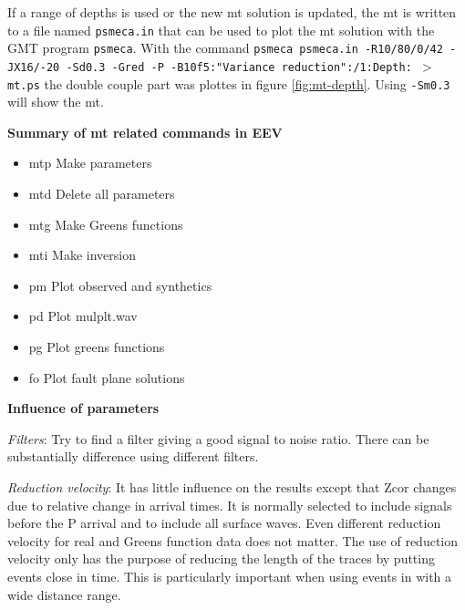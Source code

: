 If a range of depths is used or the new mt solution is updated, the mt is written to 
a file named \texttt{psmeca.in} that can be used to plot the mt solution with 
the GMT program \texttt{psmeca}. With the command\newline
\texttt{psmeca psmeca.in -R10/80/0/42 -JX16/-20 -Sd0.3 -Gred -P -B10f5:"Variance reduction":/1:Depth: $>$ mt.ps}\newline
the double couple part was plottes in figure \ref{fig:mt-depth}. 
Using \texttt{-Sm0.3} will show the mt.

\textbf{Summary of mt related commands in EEV}

\begin{itemize}
\item 
mtp	Make parameters
\item 
mtd	Delete all parameters
\item 
mtg	Make Greens functions
\item 
mti	Make inversion
\item 
pm	Plot observed and synthetics
\item 
pd	Plot mulplt.wav
\item 
pg	Plot greens functions
\item 
fo	Plot fault plane solutions
\end{itemize}

\textbf{Influence of parameters}

\textit{Filters}: Try to find a filter giving a good signal to noise ratio. There can be substantially difference using different filters. 

\textit{Reduction velocity}: It has little influence on the results except that Zcor changes due to relative change in arrival times. It is normally selected to include signals before the P arrival and to include all surface waves. Even different reduction velocity for real and Greens function data does not matter. The use of reduction velocity only has the purpose of reducing the length of the traces by putting events close in time. This is particularly important when using events in with a wide distance range.

